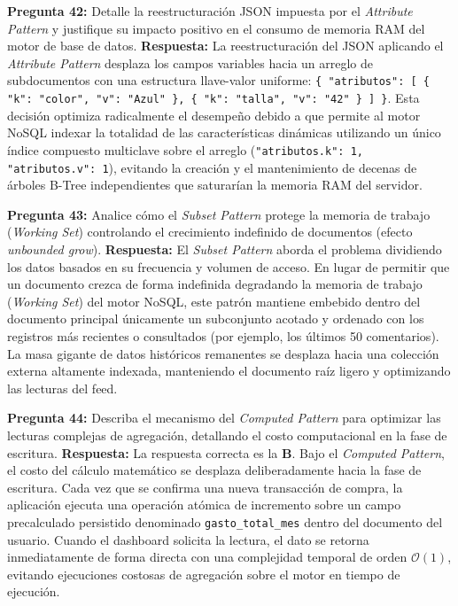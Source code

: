 \vspace{4mm}

\noindent\textbf{Pregunta 42:} Detalle la reestructuración JSON impuesta por el \textit{Attribute Pattern} y justifique su impacto positivo en el consumo de memoria RAM del motor de base de datos.
\newline
\textbf{Respuesta:} La reestructuración del JSON aplicando el \textit{Attribute Pattern} desplaza los campos variables hacia un arreglo de subdocumentos con una estructura llave-valor uniforme: \texttt{\{ "atributos": [ \{ "k": "color", "v": "Azul" \}, \{ "k": "talla", "v": "42" \} ] \}}. Esta decisión optimiza radicalmente el desempeño debido a que permite al motor NoSQL indexar la totalidad de las características dinámicas utilizando un único índice compuesto multiclave sobre el arreglo (\texttt{"atributos.k": 1, "atributos.v": 1}), evitando la creación y el mantenimiento de decenas de árboles B-Tree independientes que saturarían la memoria RAM del servidor.

\vspace{4mm}

\noindent\textbf{Pregunta 43:} Analice cómo el \textit{Subset Pattern} protege la memoria de trabajo (\textit{Working Set}) controlando el crecimiento indefinido de documentos (efecto \textit{unbounded grow}).
\newline
\textbf{Respuesta:} El \textit{Subset Pattern} aborda el problema dividiendo los datos basados en su frecuencia y volumen de acceso. En lugar de permitir que un documento crezca de forma indefinida degradando la memoria de trabajo (\textit{Working Set}) del motor NoSQL, este patrón mantiene embebido dentro del documento principal únicamente un subconjunto acotado y ordenado con los registros más recientes o consultados (por ejemplo, los últimos 50 comentarios). La masa gigante de datos históricos remanentes se desplaza hacia una colección externa altamente indexada, manteniendo el documento raíz ligero y optimizando las lecturas del feed.

\vspace{4mm}

\noindent\textbf{Pregunta 44:} Describa el mecanismo del \textit{Computed Pattern} para optimizar las lecturas complejas de agregación, detallando el costo computacional en la fase de escritura.
\newline
\textbf{Respuesta:} La respuesta correcta es la \textbf{B}. Bajo el \textit{Computed Pattern}, el costo del cálculo matemático se desplaza deliberadamente hacia la fase de escritura. Cada vez que se confirma una nueva transacción de compra, la aplicación ejecuta una operación atómica de incremento sobre un campo precalculado persistido denominado \texttt{gasto\_total\_mes} dentro del documento del usuario. Cuando el dashboard solicita la lectura, el dato se retorna inmediatamente de forma directa con una complejidad temporal de orden $\mathcal{O}(1)$, evitando ejecuciones costosas de agregación sobre el motor en tiempo de ejecución.

